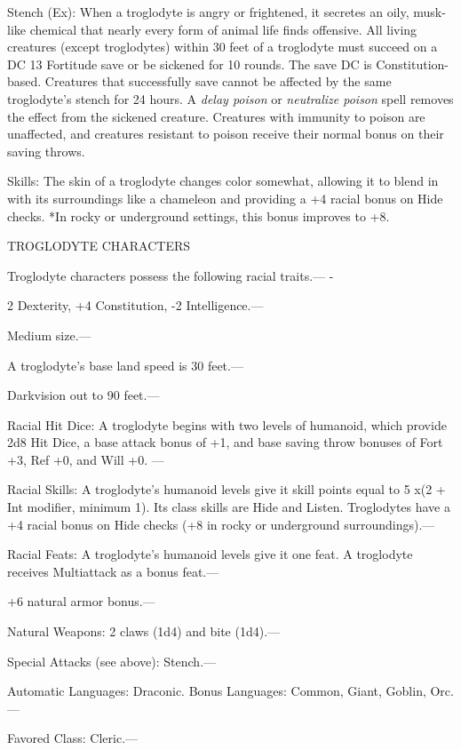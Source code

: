 \documentclass{article}
\begin{document}
Stench (Ex): When a troglodyte is angry or frightened, it secretes an oily, musk-like 
chemical that nearly every form of animal life finds offensive. All living creatures 
(except troglodytes) within 30 feet of a troglodyte must succeed on a DC 13 Fortitude 
save or be sickened for 10 rounds. The save DC is Constitution-based. Creatures 
that successfully save cannot be affected by the same troglodyte's stench for 24 
hours. A \textit{delay poison }or \textit{neutralize poison }spell removes the 
effect from the sickened creature. Creatures with immunity to poison are unaffected, 
and creatures resistant to poison receive their normal bonus on their saving throws.

Skills: The skin of a troglodyte changes color somewhat, allowing it to blend in 
with its surroundings like a chameleon and providing a +4 racial bonus on Hide 
checks. *In rocky or underground settings, this bonus improves to +8.

TROGLODYTE CHARACTERS

Troglodyte characters possess the following racial traits.--- -

\parindent=3pt
2 Dexterity, +4 Constitution, -2 Intelligence.---

\parindent=0pt
Medium size.---

A troglodyte's base land speed is 30 feet.---

Darkvision out to 90 feet.---

Racial Hit Dice: A troglodyte begins with two levels of humanoid, which provide 
2d8 Hit Dice, a base attack bonus of +1, and base saving throw bonuses of Fort 
+3, Ref +0, and Will +0. ---

Racial Skills: A troglodyte's humanoid levels give it skill points equal to 5 x$ $(2 
+ Int modifier, minimum 1). Its class skills are Hide and Listen. Troglodytes have 
a +4 racial bonus on Hide checks (+8 in rocky or underground surroundings).---

Racial Feats: A troglodyte's humanoid levels give it one feat. A troglodyte receives 
Multiattack as a bonus feat.--- 

\parindent=3pt
+6 natural armor bonus.---

\parindent=0pt
Natural Weapons: 2 claws (1d4) and bite (1d4).---

Special Attacks (see above): Stench.---

Automatic Languages: Draconic. Bonus Languages: Common, Giant, Goblin, Orc.---

Favored Class: Cleric.---
\end{document}
